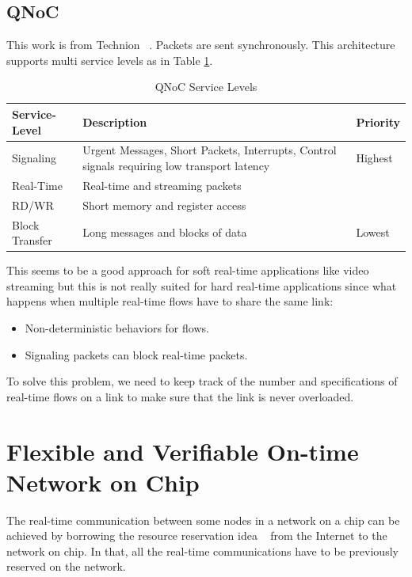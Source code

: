 \documentclass[conference, twocolumn]{IEEEtran}
\theoremstyle{definition}
\begin{document}
\subsection{QNoC}
This work is from Technion ~\cite{QNoC}. Packets are sent synchronously. 
This architecture supports multi service levels as in Table
\ref{table:QNoCTable}.

\begin{table}[htbp]
\begin{center}
  \begin{tabular}{ | p{2.3cm} | p{4cm} | p{1.2cm} |}
    \hline
	Service-Level & Description & Priority \\ \hline
	Signaling & Urgent Messages, Short Packets, Interrupts, Control signals 
	requiring low transport latency & Highest \\ \hline
	Real-Time & Real-time and streaming packets & \\ \hline
	RD/WR & Short memory and register access & \\ \hline
	Block Transfer & Long messages and blocks of data & Lowest \\
    \hline
  \end{tabular}
\end{center}
\caption{QNoC Service Levels}
\label{table:QNoCTable}
\end{table}

This seems to be a good approach for soft real-time applications like video streaming
but this is not really suited for hard real-time applications since what happens 
when multiple real-time flows have to share the same link:
\begin{itemize}
\item Non-deterministic behaviors for flows.
\item Signaling packets can block real-time packets.
\end{itemize}
To solve this problem, we need to keep track of the number and specifications of
real-time flows on a link to make sure that the link is never overloaded.

\section{Flexible and Verifiable On-time Network on Chip}
The real-time communication between some nodes in a network 
on a chip can be achieved by borrowing the resource reservation idea
~\cite{Zhang93rsvp} from the Internet to the network on chip. In that, all the
real-time communications have to be previously reserved on the network. 
\end{document}
